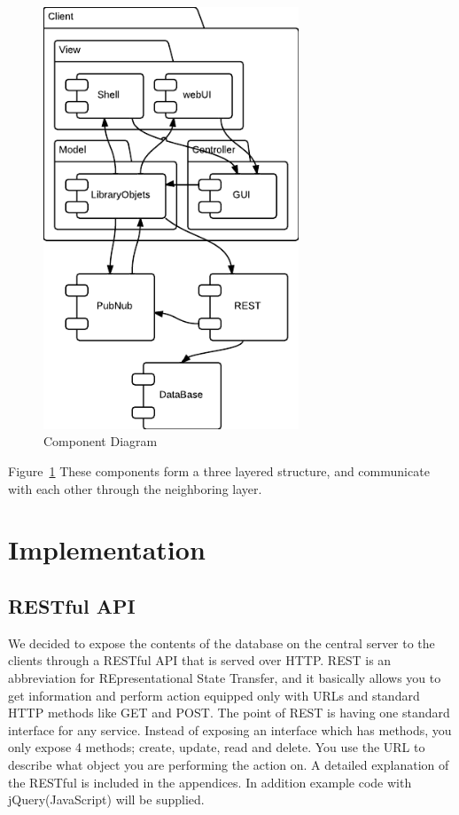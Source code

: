 \begin{figure}[h]
\centering
\includegraphics[width=3in]{image/architecture/s1/s1ComponentDiagram.png}
\caption{Component Diagram}
\label{figure:s1ComponentDiagram}
\end{figure}

Figure~\ref{figure:s1ComponentDiagram} These components form a three layered structure, and communicate with each other through the neighboring layer.


\section{Implementation}

\subsection{RESTful API}
We decided to expose the contents of the database on the central server to the clients through a RESTful API that is served over HTTP. REST is an abbreviation for REpresentational State Transfer, and it basically allows you to get information and perform action equipped only with URLs and standard HTTP methods like GET and POST. The point of REST is having one standard interface for any service. Instead of exposing an interface which has methods, you only expose 4 methods; create, update, read and delete.  You use the URL to describe what object you are performing the action on. A detailed explanation of the RESTful is included in the appendices. In addition example code with jQuery(JavaScript) will be supplied.

